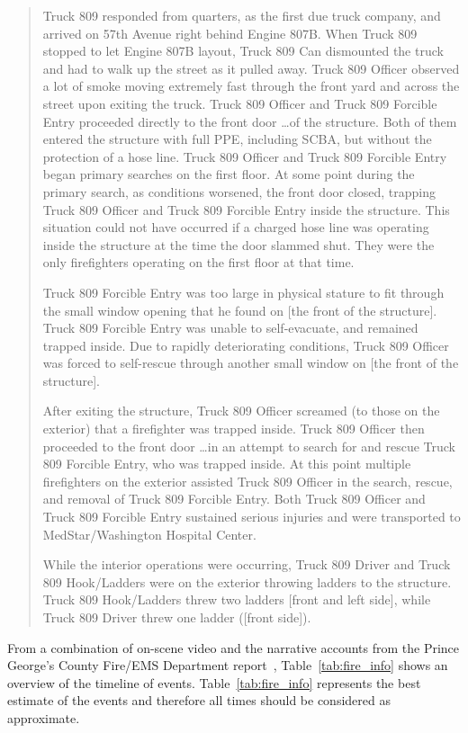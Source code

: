 \documentclass[12pt,oneside]{book}
\begin{document}
\begin{quote}
Truck 809 responded from quarters, as the first due truck company, and arrived on 57th Avenue right behind Engine 807B. When Truck 809 stopped to let Engine 807B layout, Truck 809 Can dismounted the truck and had to walk up the street as it pulled away. Truck 809 Officer observed a lot of smoke moving extremely fast through the front yard and across the street upon exiting the truck. Truck 809 Officer and Truck 809 Forcible Entry proceeded directly to the front door \ldots of the structure. Both of them entered the structure with full PPE, including SCBA, but without the protection of a hose line. Truck 809 Officer and Truck 809 Forcible Entry began primary searches on the first floor. At some point during the primary search, as conditions worsened, the front door closed, trapping Truck 809 Officer and Truck 809 Forcible Entry inside the structure. This situation could not have occurred if a charged hose line was operating inside the structure at the time the door slammed shut. They were the only firefighters operating on the first floor at that time. 

Truck 809 Forcible Entry was too large in physical stature to fit through the small window opening that he found on [the front of the structure]. Truck 809 Forcible Entry was unable to self-evacuate, and remained trapped inside. Due to rapidly deteriorating conditions, Truck 809 Officer was forced to self-rescue through another small window on [the front of the structure]. 

After exiting the structure, Truck 809 Officer screamed (to those on the exterior) that a firefighter was trapped inside. Truck 809 Officer then proceeded to the front door \ldots in an attempt to search for and rescue Truck 809 Forcible Entry, who was trapped inside. At this point multiple firefighters on the exterior assisted Truck 809 Officer in the search, rescue, and removal of Truck 809 Forcible Entry. Both Truck 809 Officer and Truck 809 Forcible Entry sustained serious injuries and were transported to MedStar/Washington Hospital Center. 

While the interior operations were occurring, Truck 809 Driver and Truck 809 Hook/Ladders were on the exterior throwing ladders to the structure. Truck 809 Hook/Ladders threw two ladders [front and left side], while Truck 809 Driver threw one ladder ([front side]). 
\end{quote}  
From a combination of on-scene video and the narrative accounts from the Prince George's County Fire/EMS Department report~\cite{PGCounty2013}, Table~\ref{tab:fire_info} shows an overview of the timeline of events. Table~\ref{tab:fire_info} represents the best estimate of the events and therefore all times should be considered as approximate.
\end{document}
